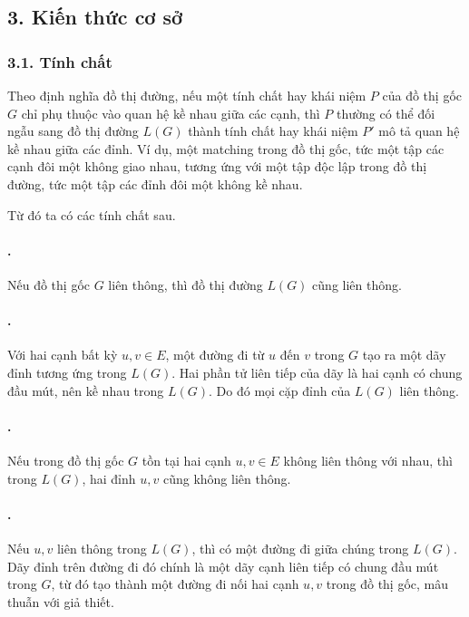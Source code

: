 \documentclass[11pt]{article}
\begin{document}
\subsection*{3. Kiến thức cơ sở}

\subsubsection*{3.1. Tính chất}

Theo định nghĩa đồ thị đường, nếu một tính chất hay khái niệm \(P\) của đồ thị
gốc \(G\) chỉ phụ thuộc vào quan hệ kề nhau giữa các cạnh, thì \(P\) thường có
thể đối ngẫu sang đồ thị đường \(L(G)\) thành tính chất hay khái niệm \(P'\)
mô tả quan hệ kề nhau giữa các đỉnh. Ví dụ, một matching trong đồ thị gốc, tức
một tập các cạnh đôi một không giao nhau, tương ứng với một tập độc lập trong
đồ thị đường, tức một tập các đỉnh đôi một không kề nhau.

Từ đó ta có các tính chất sau.

\paragraph{.}
Nếu đồ thị gốc \(G\) liên thông, thì đồ thị đường \(L(G)\) cũng liên thông.

\paragraph{.}
Với hai cạnh bất kỳ \(u,v\in E\), một đường đi từ \(u\) đến \(v\) trong \(G\)
tạo ra một dãy đỉnh tương ứng trong \(L(G)\). Hai phần tử liên tiếp của dãy là
hai cạnh có chung đầu mút, nên kề nhau trong \(L(G)\). Do đó mọi cặp đỉnh của
\(L(G)\) liên thông.

\paragraph{.}
Nếu trong đồ thị gốc \(G\) tồn tại hai cạnh \(u,v\in E\) không liên thông với
nhau, thì trong \(L(G)\), hai đỉnh \(u,v\) cũng không liên thông.

\paragraph{.}
Nếu \(u,v\) liên thông trong \(L(G)\), thì có một đường đi giữa chúng trong
\(L(G)\). Dãy đỉnh trên đường đi đó chính là một dãy cạnh liên tiếp có chung
đầu mút trong \(G\), từ đó tạo thành một đường đi nối hai cạnh \(u,v\) trong
đồ thị gốc, mâu thuẫn với giả thiết.
\end{document}
